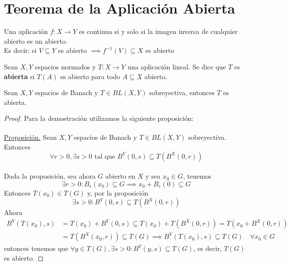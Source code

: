 \chapter{Teorema de la Aplicación Abierta}

\begin{coro}
    Una aplicación $f: X \longrightarrow Y$ es continua si y solo si la imagen inversa de cualquier abierto es un abierto. \\
    \noindent
    Es decir: si $V \subseteq Y$ es abierto $\implies f^{-1}(V) \subseteq X$ es abierto
\end{coro}

\begin{definicion}
    Sean $X, Y$ espacios normados y $T: X \to Y$ una aplicación lineal. Se dice que $T$ es \textbf{abierta} si $T(A)$ es abierto para todo $A \subseteq X$ abierto.
\end{definicion}

\begin{teo}
    Sean $X, Y$ espacios de Banach y $T \in BL(X, Y)$ sobreyectiva, entonces $T$ es abierta.

\begin{proof}
    Para la demostración utilizamos la siguiente proposición: \\ \\
    \noindent
    \underline{Proposición.} Sean $X, Y$ espacios de Banach y $T \in BL(X, Y)$ sobreyectiva. Entonces 
    $$\forall r > 0, \exists s > 0 \text{ tal que } B^Y(0, s) \subseteq T(B^X(0, r))$$ \\
    \noindent
    Dada la proposición, sea ahora $G$ abierto en $X$ y sea $x_0 \in G$, tenemos 
    $$\exists r > 0 : B_r(x_0) \subseteq G \implies x_0 + B_r(0) \subseteq G$$
    Entonces $T(x_0) \in T(G)$ y, por la proposición 
    $$\exists s > 0 : B^Y(0, s) \subseteq T(B^X(0, r))$$
    Ahora
    \begin{align*}
        B^Y(T(x_0), s) & = T(x_0) + B^Y(0, s) \subseteq T(x_0) + T(B^X(0, r)) = T(x_0 + B^X(0, r)) \\
        &= T(B^X(x_0, r)) \subseteq T(G) \implies B^Y(T(x_0), s) \subseteq T(G) \quad \forall x_0 \in G
    \end{align*}
    entonces tenemos que $\forall y\in T(G), \exists s > 0 : B^Y(y, s) \subseteq T(G)$, es decir, $T(G)$ es abierto.
\end{proof}
\end{teo}

